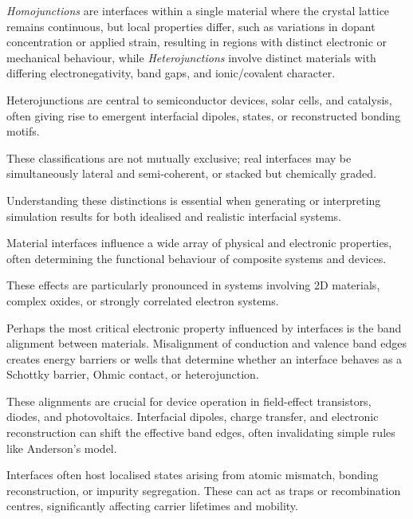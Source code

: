 \emph{Homojunctions} are interfaces within a single material where the crystal lattice remains continuous, but local
properties differ, such as variations in dopant concentration or applied strain, resulting in regions with distinct
electronic or mechanical behaviour, while \emph{Heterojunctions} involve distinct materials with differing
electronegativity, band gaps, and ionic/covalent character.

Heterojunctions are central to semiconductor devices, solar cells, and catalysis, often giving rise to emergent
interfacial dipoles, states, or reconstructed bonding motifs.

\label{para:interface_classifications_continued} %

These classifications are not mutually exclusive; real interfaces may be simultaneously lateral and semi-coherent, or
stacked but chemically graded.

Understanding these distinctions is essential when generating or interpreting simulation results for both idealised and
realistic interfacial systems.

\label{para:interface_effects_2D_oxides} %

Material interfaces influence a wide array of physical and electronic properties, often determining the functional
behaviour of composite systems and devices.

These effects are particularly pronounced in systems involving 2D materials, complex oxides, or strongly correlated
electron systems.

\label{para:band_alignment_interfaces} %

Perhaps the most critical electronic property influenced by interfaces is the band alignment between materials.
Misalignment of conduction and valence band edges creates energy barriers or wells that determine whether an interface
behaves as a Schottky barrier, Ohmic contact, or heterojunction.

These alignments are crucial for device operation in field-effect transistors, diodes, and photovoltaics.
Interfacial dipoles, charge transfer, and electronic reconstruction can shift the effective band edges, often
invalidating simple rules like Anderson's model.

\label{para:interface_states} %

Interfaces often host localised states arising from atomic mismatch, bonding reconstruction, or impurity segregation.
These can act as traps or recombination centres, significantly affecting carrier lifetimes and mobility.

